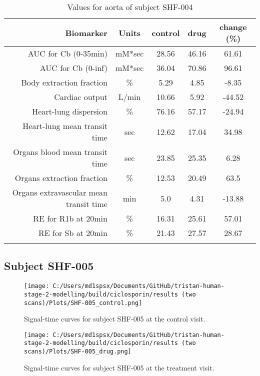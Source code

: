 \documentclass{epflreport}%
\begin{document}
\begin{longtable}{rcccc}%
\hline%
Biomarker&Units&control&drug&change (\%)\\%
\hline%
AUC for Cb (0{-}35min)&mM*sec&28.56&46.16&61.61\\%
AUC for Cb (0{-}inf)&mM*sec&36.04&70.86&96.61\\%
Body extraction fraction&\%&5.29&4.85&{-}8.35\\%
Cardiac output&L/min&10.66&5.92&{-}44.52\\%
Heart{-}lung dispersion&\%&76.16&57.17&{-}24.94\\%
Heart{-}lung mean transit time&sec&12.62&17.04&34.98\\%
Organs blood mean transit time&sec&23.85&25.35&6.28\\%
Organs extraction fraction&\%&12.53&20.49&63.5\\%
Organs extravascular mean transit time&min&5.0&4.31&{-}13.88\\%
RE for R1b at 20min&\%&16.31&25.61&57.01\\%
RE for Sb at 20min&\%&21.43&27.57&28.67\\%
\hline%
\caption{Values for aorta of subject SHF-004} \\%
\end{longtable}%
\clearpage%
\subsection{Subject SHF{-}005}%
\label{subsec:SubjectSHF{-}005}%

%


\begin{figure}[h!]%
\centering%
\texttt{[image: C:/Users/md1spsx/Documents/GitHub/tristan-human-stage-2-modelling/build/ciclosporin/results (two scans)/Plots/SHF-005\_control.png]}%
\caption{Signal{-}time curves for subject SHF{-}005 at the control visit.}%
\end{figure}

%


\begin{figure}[h!]%
\centering%
\texttt{[image: C:/Users/md1spsx/Documents/GitHub/tristan-human-stage-2-modelling/build/ciclosporin/results (two scans)/Plots/SHF-005\_drug.png]}%
\caption{Signal{-}time curves for subject SHF{-}005 at the treatment visit.}%
\end{figure}
\end{document}

